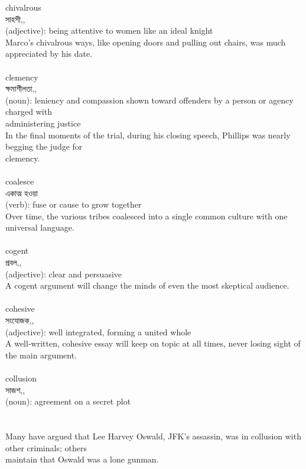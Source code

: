 \documentclass{article}
\begin{document}
{chivalrous}\\
{সাহসী,,}\\
{(adjective): being attentive to women like an ideal knight\\Marco's chivalrous ways, like opening doors and pulling out chairs, was much appreciated by his date.\\}\\
{clemency}\\
{ক্ষমাশীলতা,,}\\
{(noun): leniency and compassion shown toward offenders by a person or agency charged with\\administering justice\\In the final moments of the trial, during his closing speech, Phillips was nearly begging the judge for\\clemency.\\}\\
{coalesce}\\
{একাত্ম হওয়া}\\
{(verb): fuse or cause to grow together\\Over time, the various tribes coalesced into a single common culture with one universal language.\\}\\
{cogent}\\
{প্রবল,,}\\
{(adjective): clear and persuasive\\A cogent argument will change the minds of even the most skeptical audience.\\}\\
{cohesive}\\
{সংযোজক,,}\\
{(adjective): well integrated, forming a united whole\\A well-written, cohesive essay will keep on topic at all times, never losing sight of the main argument.\\}\\
{collusion}\\
{সাজশ,,}\\
{(noun): agreement on a secret plot\\\\                                                                                \\Many have argued that Lee Harvey Oswald, JFK's assassin, was in collusion with other criminals; others\\maintain that Oswald was a lone gunman.\\}\\
\end{document}
